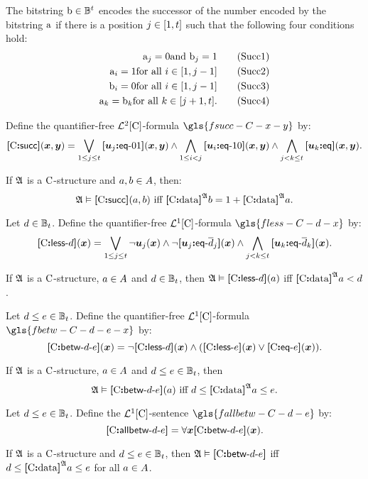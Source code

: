 The bitstring $\mathrm{b} \in \mathbb{B}^{t}$ encodes the successor of the number
encoded by the bitstring $\mathrm{a}$ if there is a position $j \in [1,t]$
such that the following four conditions hold:
\begin{align}
  \bstra_\jj = 0 \text{and } \bstrb_\jj = 1 \tag{Succ1}\label{Succ1} \\
  \bstra_\ii = 1 \text{for all } i \in [1,\jj-1] \tag{Succ2}\label{Succ2} \\
  \bstrb_\ii = 0 \text{for all } i \in [1,\jj-1] \tag{Succ3}\label{Succ3} \\
  \bstra_\kk = \bstrb_\kk \text{for all } \kk \in [\jj+1,\tbit].
  \tag{Succ4}\label{Succ4}
\end{align}
\begin{definition}
Define the quantifier-free $\mathcal{L}^{2}[{\mathrm{C}}]$-formula $\gls{fsucc-C-x-y}$ by:
\[
  {\bm{[}{\mathrm{C}}\mathord{\bm{:}}\mathsf{succ}\bm{]}}(\bm{x},\bm{y}) = \bigvee_{1 \leq j \leq t}
  {\bm{[}\bm{u}_{j}\mathord{\bm{:}}\mathsf{eq}{\hbox{-}}01\bm{]}}(\bm{x},\bm{y}) \land 
  \bigwedge_{1 \leq i < j} 
  {\bm{[}\bm{u}_{i}\mathord{\bm{:}}\mathsf{eq}{\hbox{-}}10\bm{]}}(\bm{x},\bm{y}) \land
  \bigwedge_{j < k \leq t} {\bm{[}\bm{u}_{k}\mathord{\bm{:}}\mathsf{eq}\bm{]}}(\bm{x},\bm{y}).
\]
\end{definition}
If $\mathfrak{A}$ is a ${\mathrm{C}}$-structure and $a, b \in A$,
then:
\[
  \miff{
  \StrA \vDash \fsucc\CS(\ea, \eb)}{
  \data\CS\StrA\eb = 1 + \data\CS\StrA\ea}.
\]

\begin{definition}
Let $d \in \mathbb{B}_{t}$.
Define the quantifier-free $\mathcal{L}^{1}[{\mathrm{C}}]$-formula $\gls{fless-C-d-x}$ by:
\[
  {\bm{[}{\mathrm{C}}\mathord{\bm{:}}\mathsf{less}{\hbox{-}}d\bm{]}}(\bm{x}) = \bigvee_{1 \leq j \leq t} \lnot\bm{u}_{j}(\bm{x})
  \land \lnot{\bm{[}\bm{u}_{j}\mathord{\bm{:}}\mathsf{eq}{\hbox{-}}\overline{d}_j\bm{]}}(\bm{x})
    \land \bigwedge_{j < k \leq t} {\bm{[}\bm{u}_{k}\mathord{\bm{:}}\mathsf{eq}{\hbox{-}}\overline{d}_k\bm{]}}(\bm{x}).
\]
\end{definition}
If $\mathfrak{A}$ is a ${\mathrm{C}}$-structure, $a \in A$ and $d \in
\mathbb{B}_{t}$, then $\mathfrak{A} \vDash {\bm{[}{\mathrm{C}}\mathord{\bm{:}}\mathsf{less}{\hbox{-}}d\bm{]}}(a)$ iff ${\bm{[}{\mathrm{C}}\mathord{\bm{:}}\mathrm{data}\bm{]}}^{\mathfrak{A}}a
< d$.

\begin{definition}
Let $d \leq e \in \mathbb{B}_{t}$.
Define the quantifier-free $\mathcal{L}^{1}[{\mathrm{C}}]$-formula $\gls{fbetw-C-d-e-x}$ by:
\[
  {\bm{[}{\mathrm{C}}\mathord{\bm{:}}\mathsf{betw}{\hbox{-}}d{\hbox{-}}e\bm{]}}(\bm{x}) = \lnot{\bm{[}{\mathrm{C}}\mathord{\bm{:}}\mathsf{less}{\hbox{-}}d\bm{]}}(\bm{x}) \land 
  ({\bm{[}{\mathrm{C}}\mathord{\bm{:}}\mathsf{less}{\hbox{-}}e\bm{]}}(\bm{x})\lor {\bm{[}{\mathrm{C}}\mathord{\bm{:}}\mathsf{eq}{\hbox{-}}e\bm{]}}(\bm{x})).
\]
\end{definition}
If $\mathfrak{A}$ is a ${\mathrm{C}}$-structure, $a \in A$ and $d \leq e \in
\mathbb{B}_{t}$, then 
\[
  \miff{
  \StrA \vDash \fbetw\CS\datad\datae(\ea)}{
  \datad \leq \data\CS\StrA\ea \leq
  \datae}.
\]

\begin{definition}
Let $d \leq e \in \mathbb{B}_{t}$.
Define the $\mathcal{L}^{1}[{\mathrm{C}}]$-sentence $\gls{fallbetw-C-d-e}$ by:
\[
  {\bm{[}{\mathrm{C}}\mathord{\bm{:}}\mathsf{allbetw}{\hbox{-}}d{\hbox{-}}e\bm{]}} = \forall\bm{x}{\bm{[}{\mathrm{C}}\mathord{\bm{:}}\mathsf{betw}{\hbox{-}}d{\hbox{-}}e\bm{]}}(\bm{x}).
\]
\end{definition}
If $\mathfrak{A}$ is a ${\mathrm{C}}$-structure and $d \leq e \in \mathbb{B}_{t}$,
then $\mathfrak{A} \vDash {\bm{[}{\mathrm{C}}\mathord{\bm{:}}\mathsf{betw}{\hbox{-}}d{\hbox{-}}e\bm{]}}$ iff
$d \leq {\bm{[}{\mathrm{C}}\mathord{\bm{:}}\mathrm{data}\bm{]}}^{\mathfrak{A}}a \leq e$ for all $a \in A$.
